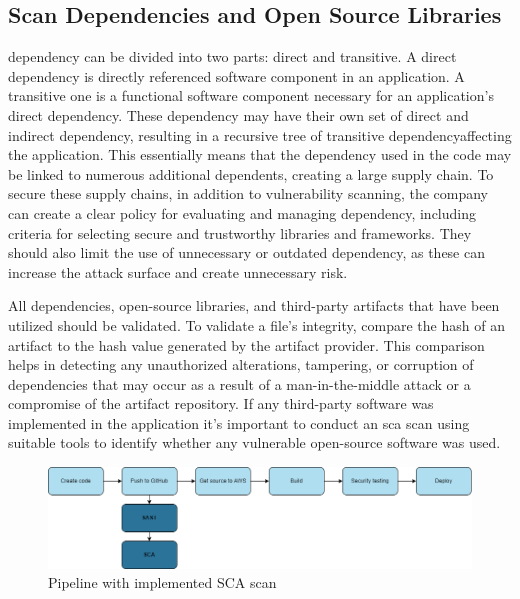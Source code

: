 \subsection{Scan Dependencies and Open Source Libraries}

\gls{dependency} can be divided into two parts: direct and transitive. A direct dependency is directly referenced software component in an application. A transitive one is a functional software component necessary for an application's direct \gls{dependency}. These \gls{dependency} may have their own set of direct and indirect \gls{dependency}, resulting in a recursive tree of transitive \gls{dependency}affecting the application. This essentially means that the \gls{dependency} used in the code may be linked to numerous additional dependents, creating a large supply chain. To secure these supply chains, in addition to vulnerability scanning, the company can create a clear policy for evaluating and managing \gls{dependency}, including criteria for selecting secure and trustworthy libraries and frameworks. They should also limit the use of unnecessary or outdated \gls{dependency}, as these can increase the attack surface and create unnecessary risk. \cite{googledependency}

All dependencies, open-source libraries, and third-party \gls{artifact}s that have been utilized should be validated. To validate a file's integrity, compare the hash of an artifact to the hash value generated by the artifact provider. This comparison helps in detecting any unauthorized alterations, tampering, or corruption of dependencies that may occur as a result of a man-in-the-middle attack or a compromise of the artifact repository. If any third-party software was implemented in the application it's important to conduct an \acrshort{sca} scan using suitable tools to identify whether any vulnerable open-source software was used. \cite{bestpracticeSupplyChain}


\vspace{2mm}
\begin{figure}[H]
    \centering
    \includegraphics[width=0.8\columnwidth]{Images/pipeline3.png}
    \caption{Pipeline with implemented SCA scan}
    \label{fig: Pipeline with implemented SCA scan}
\end{figure}

